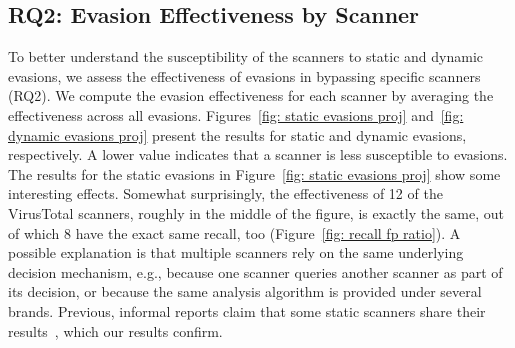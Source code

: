 \subsection{RQ2: Evasion Effectiveness by Scanner}

To better understand the susceptibility of the scanners to static and dynamic evasions, we assess the effectiveness of evasions in bypassing specific 
scanners (RQ2).
We compute the evasion effectiveness for each 
scanner by averaging the effectiveness across all evasions.
Figures~\ref{fig: static evasions proj} and~\ref{fig: dynamic evasions proj} 
present the results for static and dynamic evasions, respectively.
A lower value indicates that a scanner is less susceptible to evasions.
The results for the static evasions in Figure~\ref{fig: static evasions 
proj} show some interesting effects.
Somewhat surprisingly, the effectiveness of 12 of the~\nbVirusTotalEngines{} VirusTotal scanners, roughly 
in the middle of the figure, is exactly the same, out of which 8 have the exact same recall, too (Figure~\ref{fig: recall fp ratio}).
A possible explanation is that multiple scanners rely on 
the same underlying decision mechanism, e.g., because one scanner queries 
another scanner as part of its decision, or because the same analysis 
algorithm is provided under several brands.
Previous, informal reports claim that some static scanners share their results~\cite{static_analyzers_share_analysis_result}, which our results 
confirm.


